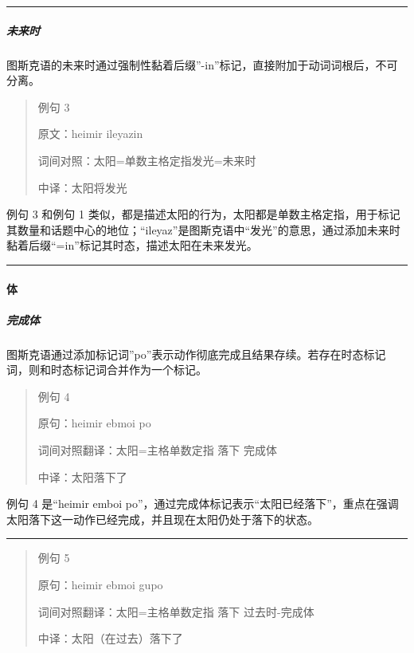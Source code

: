 \documentclass{article}
\begin{document}
\begin{center}\rule{0.5\linewidth}{0.5pt}\end{center}

\subparagraph{未来时}\label{ux672aux6765ux65f6}

图斯克语的未来时通过强制性黏着后缀''-in''标记，直接附加于动词词根后，不可分离。

\begin{quote}
例句 3

原文：heimir ileyazin

词间对照：太阳=单数主格定指发光=未来时

中译：太阳将发光
\end{quote}

例句 3 和例句 1
类似，都是描述太阳的行为，太阳都是单数主格定指，用于标记其数量和话题中心的地位；``ileyaz''是图斯克语中``发光''的意思，通过添加未来时黏着后缀``=in''标记其时态，描述太阳在未来发光。

\begin{center}\rule{0.5\linewidth}{0.5pt}\end{center}

\paragraph{体}\label{ux4f53}

\subparagraph{完成体}\label{ux5b8cux6210ux4f53}

图斯克语通过添加标记词''po''表示动作彻底完成且结果存续。若存在时态标记词，则和时态标记词合并作为一个标记。

\begin{quote}
例句 4

原句：heimir ebmoi po

词间对照翻译：太阳=主格单数定指 落下 完成体

中译：太阳落下了
\end{quote}

例句 4 是``heimir emboi
po''，通过完成体标记表示``太阳已经落下''，重点在强调太阳落下这一动作已经完成，并且现在太阳仍处于落下的状态。

\begin{center}\rule{0.5\linewidth}{0.5pt}\end{center}

\begin{quote}
例句 5

原句：heimir ebmoi gupo

词间对照翻译：太阳=主格单数定指 落下 过去时-完成体

中译：太阳（在过去）落下了
\end{quote}
\end{document}

